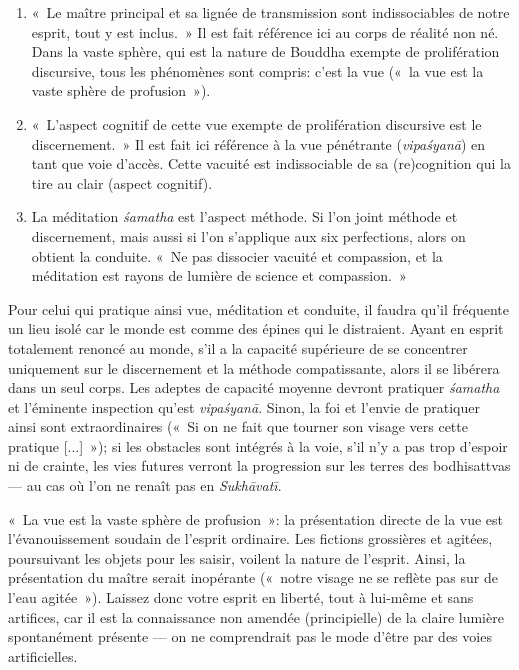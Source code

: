 \documentclass[a4paper]{article}
\begin{document}
\begin{enumerate}

  \item «~Le maître principal et sa lignée de transmission sont
        indissociables de notre esprit, tout y est inclus.~» Il est
        fait référence ici au corps de réalité non né. Dans la vaste
        sphère, qui est la nature de Bouddha exempte de prolifération
        discursive, tous les phénomènes sont compris: c'est la vue
        («~la vue est la vaste sphère de profusion~»).

  \item «~L'aspect cognitif de cette vue exempte de prolifération
        discursive est le discernement.~» Il est fait ici référence à
        la vue pénétrante (\emph{vipa\'{s}yan\={a}}) en tant que voie
        d'accès. Cette vacuité est indissociable de sa (re)cognition
        qui la tire au clair (aspect cognitif).

  \item La méditation \emph{\'{s}amatha} est l'aspect méthode. Si l'on
        joint méthode et discernement, mais aussi si l'on s'applique
        aux six perfections, alors on obtient la conduite. «~Ne pas
        dissocier vacuité et compassion, et la méditation est rayons
        de lumière de science et compassion.~»

\end{enumerate}

Pour celui qui pratique ainsi vue, méditation et conduite, il faudra
qu'il fréquente un lieu isolé car le monde est comme des épines qui le
distraient. Ayant en esprit totalement renoncé au monde, s'il a la
capacité supérieure de se concentrer uniquement sur le discernement et
la méthode compatissante, alors il se libérera dans un seul corps. Les
adeptes de capacité moyenne devront pratiquer \emph{\'{s}amatha} et
l'éminente inspection qu'est \emph{vipa\'{s}yan\={a}}. Sinon, la foi
et l'envie de pratiquer ainsi sont extraordinaires («~Si on ne fait
que tourner son visage vers cette pratique [...]~»); si les obstacles
sont intégrés à la voie, s'il n'y a pas trop d'espoir ni de crainte,
les vies futures verront la progression sur les terres des
bodhisattvas --- au cas où l'on ne renaît pas en
\emph{Sukh\={a}vat\={\i}}.

«~La vue est la vaste sphère de profusion~»: la présentation directe
de la vue est l'évanouissement soudain de l'esprit ordinaire. Les
fictions grossières et agitées, poursuivant les objets pour les
saisir, voilent la nature de l'esprit. Ainsi, la présentation du
maître serait inopérante («~notre visage ne se reflète pas sur de
l'eau agitée~»). Laissez donc votre esprit en liberté, tout à lui-même
et sans artifices, car il est la connaissance non amendée
(principielle) de la claire lumière spontanément présente --- on ne
comprendrait pas le mode d'être par des voies artificielles.
\end{document}
